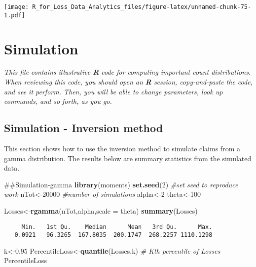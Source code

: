 \documentclass[]{book}
\newenvironment{Shaded}{\begin{snugshade}}{\end{snugshade}}
\newcommand{\KeywordTok}[1]{\textcolor[rgb]{0.13,0.29,0.53}{\textbf{#1}}}
\newcommand{\DataTypeTok}[1]{\textcolor[rgb]{0.13,0.29,0.53}{#1}}
\newcommand{\DecValTok}[1]{\textcolor[rgb]{0.00,0.00,0.81}{#1}}
\newcommand{\FloatTok}[1]{\textcolor[rgb]{0.00,0.00,0.81}{#1}}
\newcommand{\CommentTok}[1]{\textcolor[rgb]{0.56,0.35,0.01}{\textit{#1}}}
\newcommand{\NormalTok}[1]{#1}
\theoremstyle{definition}
\theoremstyle{definition}
\theoremstyle{definition}
\theoremstyle{remark}
\begin{document}
\texttt{[image: R\_for\_Loss\_Data\_Analytics\_files/figure-latex/unnamed-chunk-75-1.pdf]}

\chapter{Simulation}\label{simulation}

\emph{This file contains illustrative \textbf{R} code for computing
important count distributions. When reviewing this code, you should open
an \textbf{R} session, copy-and-paste the code, and see it perform.
Then, you will be able to change parameters, look up commands, and so
forth, as you go. }

\section{Simulation - Inversion
method}\label{simulation---inversion-method}

This section shows how to use the inversion method to simulate claims
from a gamma distribution. The results below are summary statistics from
the simulated data.

\begin{Shaded}
\begin{Highlighting}[]
\NormalTok{##Simulation-gamma}
\KeywordTok{library}\NormalTok{(moments)}
\KeywordTok{set.seed}\NormalTok{(}\DecValTok{2}\NormalTok{) }\CommentTok{#set seed to reproduce work }
\NormalTok{nTot<-}\DecValTok{20000}  \CommentTok{#number of simulations}
\NormalTok{alpha<-}\DecValTok{2}
\NormalTok{theta<-}\DecValTok{100}
         
\NormalTok{Losses<-}\KeywordTok{rgamma}\NormalTok{(nTot,alpha,}\DataTypeTok{scale =}\NormalTok{ theta)  }
\KeywordTok{summary}\NormalTok{(Losses)}
\end{Highlighting}
\end{Shaded}

\begin{verbatim}
     Min.   1st Qu.    Median      Mean   3rd Qu.      Max. 
   0.0921   96.3265  167.8035  200.1747  268.2257 1110.1298 
\end{verbatim}

\begin{Shaded}
\begin{Highlighting}[]
\NormalTok{k<-}\FloatTok{0.95}
\NormalTok{PercentileLoss<-}\KeywordTok{quantile}\NormalTok{(Losses,k)     }\CommentTok{# Kth percentile of Losses }
\NormalTok{PercentileLoss}
\end{Highlighting}
\end{Shaded}
\end{document}
